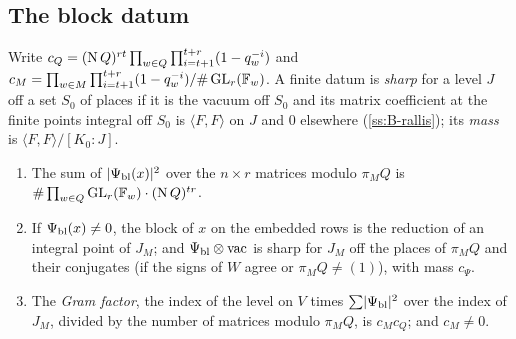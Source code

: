 \subsection{The block datum}\label{ss:block-datum}
Write $c_Q=(\operatorname{N} Q)^{rt}\prod_{w\in Q}\prod_{i=t+1}^{t+r}(1-q_w^{-i})$ and $c_M=\prod_{w\in M}\prod_{i=t+1}^{t+r}(1-q_w^{-i})/\#\operatorname{GL}_r(\mathbb{F}_w)$. A finite datum is \emph{sharp} for a level $J$ off
a set $S_0$ of places if it is the vacuum off $S_0$ and its matrix coefficient at the finite points integral off $S_0$ is $\langle F,F\rangle$ on $J$ and $0$ elsewhere
(\cref{ss:B-rallis}); its \emph{mass} is $\langle F,F\rangle/[K_0:J]$.

\begin{proposition}\label{prop:block-sharp}
\begin{enumerate}[label=\textup{(\alph*)}]
\item The sum of $\lvert \Psi_{\rm bl}(x)\rvert^2$ over the $n\times r$ matrices modulo $\pi_MQ$ is $\#\prod_{w\in Q}\operatorname{GL}_r(\mathbb{F}_w)\cdot(\operatorname{N} Q)^{tr}$.
\item If $\Psi_{\rm bl}(x)\ne0$, the block of $x$ on the embedded rows is the reduction of an integral point of $J_M$; and $\Psi_{\rm bl}\otimes\mathrm{vac}$ is sharp for $J_M$ off the places of
$\pi_MQ$ and their conjugates (if the signs of $W$ agree or $\pi_MQ\ne(1)$), with mass $c_\Psi$.
\item The \emph{Gram factor}, the index of the level on $V$ times $\sum\lvert \Psi_{\rm bl}\rvert^2$ over the index of $J_M$, divided by the number of matrices modulo $\pi_MQ$, is $c_Mc_Q$; and
$c_M\ne0$.
\end{enumerate}
\end{proposition}

